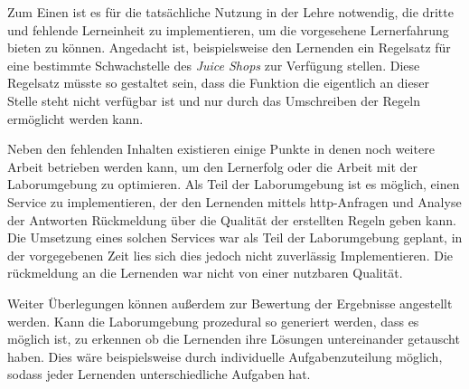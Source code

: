 Zum Einen ist es für die tatsächliche Nutzung in der Lehre notwendig, die dritte und fehlende Lerneinheit zu implementieren, um die vorgesehene Lernerfahrung bieten zu können.
Angedacht ist, beispielsweise den Lernenden ein Regelsatz für eine bestimmte Schwachstelle des \textit{Juice Shops} zur Verfügung stellen.
Diese Regelsatz müsste so gestaltet sein, dass die Funktion die eigentlich an dieser Stelle steht nicht verfügbar ist und nur durch das Umschreiben der Regeln ermöglicht werden kann.

Neben den fehlenden Inhalten existieren einige Punkte in denen noch weitere Arbeit betrieben werden kann, um den Lernerfolg oder die Arbeit mit der Laborumgebung zu optimieren.
Als Teil der Laborumgebung ist es möglich, einen Service zu implementieren, der den Lernenden mittels \ac{http}-Anfragen und Analyse der Antworten Rückmeldung über die Qualität der erstellten Regeln geben kann.
Die Umsetzung eines solchen Services war als Teil der Laborumgebung geplant, in der vorgegebenen Zeit lies sich dies jedoch nicht zuverlässig Implementieren.
Die rückmeldung an die Lernenden war nicht von einer nutzbaren Qualität.

Weiter Überlegungen können außerdem zur Bewertung der Ergebnisse angestellt werden.
Kann die Laborumgebung prozedural so generiert werden, dass es möglich ist, zu erkennen ob die Lernenden ihre Lösungen untereinander getauscht haben.
Dies wäre beispielsweise durch individuelle Aufgabenzuteilung möglich, sodass jeder Lernenden unterschiedliche Aufgaben hat.

